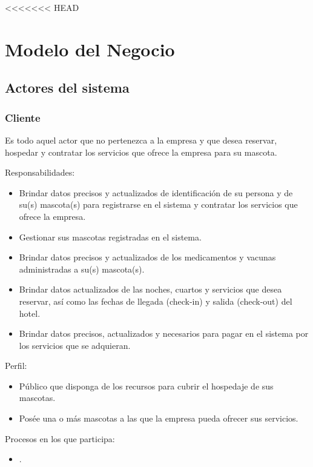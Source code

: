 <<<<<<< HEAD

\chapter{Modelo del Negocio}	
\label{cap:reqSist}


\section{Actores del sistema}

	
	\begin{Usuario}{\hypertarget{Cliente}{\subsection{Cliente}}}{
			Es todo aquel actor que no pertenezca a la empresa y que desea reservar, hospedar y contratar los servicios que ofrece la empresa para su mascota.
		}
		\item[Responsabilidades:] \cdtEmpty
		\begin{itemize}
			\item Brindar datos precisos y actualizados de identificación de su persona y de su(s) mascota(s) para registrarse en el sistema y contratar los servicios que ofrece la empresa.
			\item Gestionar sus mascotas registradas en el sistema.
			\item Brindar datos precisos y actualizados de los medicamentos y vacunas administradas a su(s) mascota(s).
			\item Brindar datos actualizados de las noches, cuartos y servicios que desea reservar, así como las fechas de llegada (check-in) y salida (check-out) del hotel.
			\item Brindar datos precisos, actualizados y necesarios para pagar en el sistema por los servicios que se adquieran.
		\end{itemize}
		
		\item[Perfil:] \cdtEmpty
		\begin{itemize}
			\item Público que disponga de los recursos para cubrir el hospedaje de sus mascotas.
			\item Posée una o más mascotas a las que la empresa pueda ofrecer sus servicios.
		\end{itemize}
		\item[Procesos en los que participa:] \cdtEmpty
		\begin{itemize}
			\item .
		\end{itemize}
	\end{Usuario}

